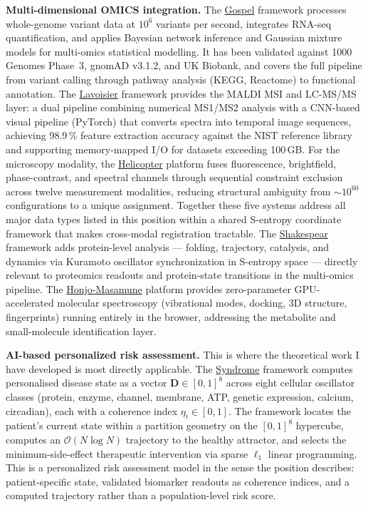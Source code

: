\documentclass[12pt,a4paper]{article}
\begin{document}
\textbf{Multi-dimensional OMICS integration.}
The \href{https://github.com/fullscreen-triangle/gospel}{Gospel} framework processes
whole-genome variant data at $10^6$ variants per second, integrates RNA-seq
quantification, and applies Bayesian network inference and Gaussian mixture models
for multi-omics statistical modelling. It has been validated against 1000 Genomes
Phase~3, gnomAD v3.1.2, and UK Biobank, and covers the full pipeline from
variant calling through pathway analysis (KEGG, Reactome) to functional annotation.
The \href{https://github.com/fullscreen-triangle/lavoisier}{Lavoisier} framework
provides the MALDI MSI and LC-MS/MS layer: a dual pipeline combining numerical
MS1/MS2 analysis with a CNN-based visual pipeline (PyTorch) that converts spectra
into temporal image sequences, achieving 98.9\,\% feature extraction accuracy
against the NIST reference library and supporting memory-mapped I/O for datasets
exceeding 100\,GB. For the microscopy modality, the
\href{https://github.com/fullscreen-triangle/helicopter}{Helicopter} platform
fuses fluorescence, brightfield, phase-contrast, and spectral channels through
sequential constraint exclusion across twelve measurement modalities, reducing
structural ambiguity from ${\sim}10^{60}$ configurations to a unique assignment.
Together these five systems address all major data types listed in this position
within a shared S-entropy coordinate framework that makes cross-modal registration
tractable. The
\href{https://github.com/fullscreen-triangle/shakespear}{Shakespear} framework
adds protein-level analysis --- folding, trajectory, catalysis, and dynamics via
Kuramoto oscillator synchronization in S-entropy space --- directly relevant to
proteomics readouts and protein-state transitions in the multi-omics pipeline.
The \href{https://honjo-masamune.vercel.app/tools}{Honjo-Masamune} platform
provides zero-parameter GPU-accelerated molecular spectroscopy (vibrational modes,
docking, 3D structure, fingerprints) running entirely in the browser, addressing
the metabolite and small-molecule identification layer.

\textbf{AI-based personalized risk assessment.}
This is where the theoretical work I have developed is most directly applicable.
The \href{https://github.com/fullscreen-triangle/syndrome}{Syndrome} framework
computes personalised disease state as a vector $\mathbf{D}\in[0,1]^8$ across
eight cellular oscillator classes (protein, enzyme, channel, membrane, ATP, genetic
expression, calcium, circadian), each with a coherence index $\eta_i\in[0,1]$.
The framework locates the patient's current state within a partition geometry on
the $[0,1]^8$ hypercube, computes an $\mathcal{O}(N\log N)$ trajectory to the
healthy attractor, and selects the minimum-side-effect therapeutic intervention
via sparse $\ell_1$ linear programming. This is a personalized risk assessment
model in the sense the position describes: patient-specific state, validated
biomarker readouts as coherence indices, and a computed trajectory rather than
a population-level risk score.
\end{document}
